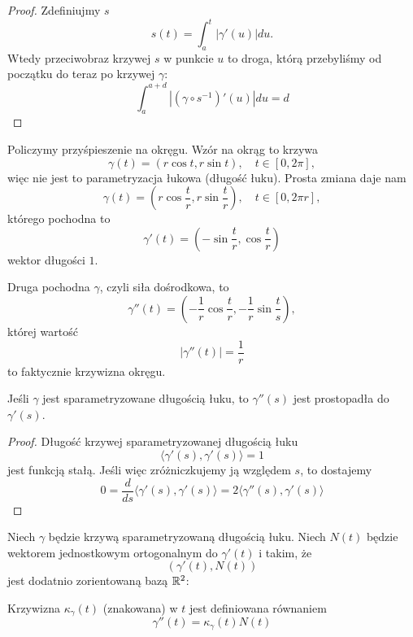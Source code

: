 \begin{proof}
  Zdefiniujmy $s$ 
  $$s(t)=\int_a^t|\gamma'(u)|du.$$
  Wtedy przeciwobraz krzywej $s$ w punkcie $u$ to droga, którą przebyliśmy od początku do teraz po krzywej $\gamma$:
  $$\int_a^{a+d}|(\gamma\circ s^{-1})'(u)|du=d$$
\end{proof}

\begin{example}
  Policzymy przyśpieszenie na okręgu. Wzór na okrąg to krzywa
  $$\gamma(t)=(r\cos t, r\sin t),\quad t\in[0,2\pi],$$
  więc nie jest to parametryzacja łukowa (długość łuku). Prosta zmiana daje nam
  $$\gamma(t)=(r\cos \frac{t}{r}, r\sin \frac{t}{r}),\quad t\in[0,2\pi r],$$
  którego pochodna to 
  $$\gamma'(t)=(-\sin\frac{t}{r}, \cos\frac{t}{r})$$
  wektor długości $1$.

  Druga pochodna $\gamma$, czyli siła dośrodkowa, to
  $$\gamma''(t)=(-\frac{1}{r}\cos\frac{t}{r}, -\frac{1}{r}\sin\frac{t}{s}),$$
  której wartość
  $$|\gamma''(t)|=\frac{1}{r}$$
  to faktycznie krzywizna okręgu.
\end{example}

\begin{lemma}{}{}
  Jeśli $\gamma$ jest sparametryzowane długością łuku, to $\gamma''(s)$ jest prostopadła do $\gamma'(s)$.
\end{lemma}

\begin{proof}
  Długość krzywej sparametryzowanej długością łuku
  $$\langle \gamma'(s), \gamma'(s)\rangle=1$$
  jest funkcją stałą. Jeśli więc zróżniczkujemy ją względem $s$, to dostajemy
  $$0=\frac{d}{ds}\langle \gamma'(s), \gamma'(s)\rangle=2\langle\gamma''(s),\gamma'(s)\rangle $$
\end{proof}

\begin{definition}{}{}
  Niech $\gamma$ będzie krzywą sparametryzowaną długością łuku. Niech $N(t)$ będzie wektorem jednostkowym ortogonalnym do $\gamma'(t)$ i takim, że 
  $$(\gamma'(t), N(t))$$
  jest dodatnio zorientowaną bazą $\mathbb{R}^2$:
  \begin{center}
  \end{center}
  Krzywizna $\kappa_\gamma(t)$ (znakowana) w $t$ jest definiowana równaniem
  $$\gamma''(t)=\kappa_\gamma(t)N(t)$$
\end{definition}

